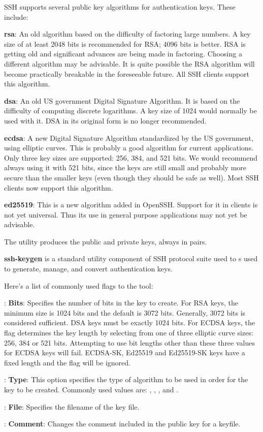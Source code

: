 SSH supports several public key algorithms for authentication keys. These include:
\bit
\item \textbf{rsa}: An old algorithm based on the difficulty of factoring large numbers. A key size of at least 2048
bits is recommended for RSA; 4096 bits is better. RSA is getting old and significant advances are being made in
factoring. Choosing a different algorithm may be advisable. It is quite possible the RSA algorithm will become
practically breakable in the foreseeable future. All SSH clients support this algorithm.
\item \textbf{dsa}: An old US government Digital Signature Algorithm. It is based on the difficulty of computing
discrete logarithms. A key size of 1024 would normally be used with it. DSA in its original form is no longer
recommended.
\item \textbf{ecdsa}: A new Digital Signature Algorithm standardized by the US government, using elliptic curves. This
is probably a good algorithm for current applications. Only three key sizes are supported: 256, 384, and 521 bits. We
would recommend always using it with 521 bits, since the keys are still small and probably more secure than the smaller
keys (even though they should be safe as well). Most SSH clients now support this algorithm.
\item \textbf{ed25519}: This is a new algorithm added in OpenSSH. Support for it in clients is not yet universal.
Thus its use in general purpose applications may not yet be advisable.
\eit

The  utility produces the public and private keys, always in pairs.

\textbf{ssh-keygen} is a standard utility component of SSH protocol suite used to s used to generate, manage, and
convert authentication keys.
\ed

Here's a list of commonly used flags to the  tool:
\bit
\item {}: \textbf{Bits}:  Specifies the number of bits in the key to create. For RSA keys, the minimum size is
1024 bits and the default is 3072 bits. Generally, 3072 bits is considered sufficient. DSA keys must be exactly 1024
bits. For ECDSA keys, the flag determines the key length by selecting from one of three elliptic curve sizes: 256,
384 or 521 bits. Attempting to use bit lengths other than these three values for ECDSA keys will fail. ECDSA-SK,
Ed25519 and Ed25519-SK keys have a fixed length and the flag will be ignored.
\item {}: \textbf{Type}: This option specifies the type of algorithm to be used in order for the key to be
created. Commonly used values are: , , , and .
\item {}: \textbf{File}: Specifies the filename of the key file.
\item {}: \textbf{Comment}: Changes the comment included in the public key for a keyfile.
\eit

